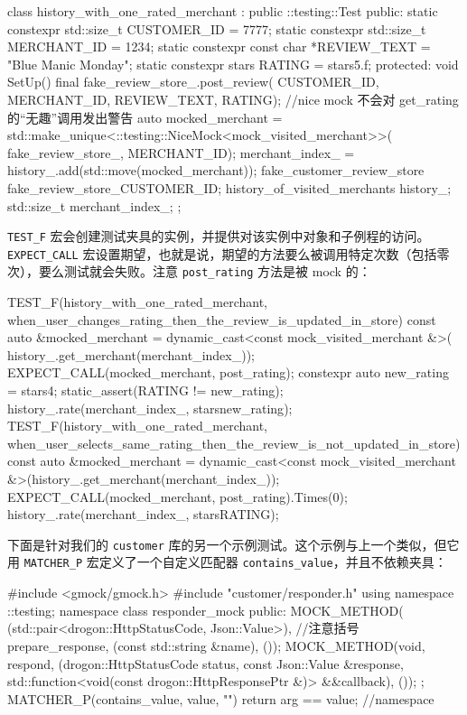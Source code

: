 \begin{codebox}[cpp]
class history_with_one_rated_merchant : public ::testing::Test {
public:
  static constexpr std::size_t CUSTOMER_ID = 7777;
  static constexpr std::size_t MERCHANT_ID = 1234;
  static constexpr const char *REVIEW_TEXT = "Blue Manic Monday";
  static constexpr stars RATING = stars{5.f};
protected:
  void SetUp() final {
    fake_review_store_.post_review(
        {CUSTOMER_ID, MERCHANT_ID, REVIEW_TEXT, RATING});
    //nice mock 不会对 get_rating 的“无趣”调用发出警告
    auto mocked_merchant =
        std::make_unique<::testing::NiceMock<mock_visited_merchant>>(
            fake_review_store_, MERCHANT_ID);
    merchant_index_ = history_.add(std::move(mocked_merchant));
  }
  fake_customer_review_store fake_review_store_{CUSTOMER_ID};
  history_of_visited_merchants history_{};
  std::size_t merchant_index_{};
};
\end{codebox}

\label{idx:853}
\texttt{TEST\_F} 宏会创建测试夹具的实例，并提供对该实例中对象和子例程的访问。\texttt{EXPECT\_\allowbreak{}CALL} 宏设置期望，也就是说，期望的方法要么被调用特定次数（包括零次），要么测试就会失败。注意 \texttt{post\_\allowbreak{}rating} 方法是被 mock 的：

\begin{codebox}[cpp]
TEST_F(history_with_one_rated_merchant,
       when_user_changes_rating_then_the_review_is_updated_in_store) {
  const auto &mocked_merchant = dynamic_cast<const mock_visited_merchant &>(
      history_.get_merchant(merchant_index_));
  EXPECT_CALL(mocked_merchant, post_rating);
  constexpr auto new_rating = stars{4};
  static_assert(RATING != new_rating);
  history_.rate(merchant_index_, stars{new_rating});
}
TEST_F(history_with_one_rated_merchant,
       when_user_selects_same_rating_then_the_review_is_not_updated_in_store) {
  const auto &mocked_merchant = dynamic_cast<const mock_visited_merchant &>(history_.get_merchant(merchant_index_));
  EXPECT_CALL(mocked_merchant, post_rating).Times(0);
  history_.rate(merchant_index_, stars{RATING});
}
\end{codebox}

下面是针对我们的 \texttt{customer} 库的另一个示例测试。这个示例与上一个类似，但它用 \texttt{MATCHER\_\allowbreak{}P} 宏定义了一个自定义匹配器 \texttt{contains\_\allowbreak{}value}，并且不依赖夹具：

\begin{codebox}[cpp]
#include <gmock/gmock.h>
#include "customer/responder.h"
using namespace ::testing;
namespace {
class responder_mock {
public:
  MOCK_METHOD(
      (std::pair<drogon::HttpStatusCode, Json::Value>),  //注意括号
      prepare_response, (const std::string &name), ());
  MOCK_METHOD(void, respond,
             (drogon::HttpStatusCode status, const Json::Value &response,
              std::function<void(const drogon::HttpResponsePtr &)>  
              &&callback),
              ());
};
MATCHER_P(contains_value, value, "") { return arg == value; }
}  //namespace
\end{codebox}

